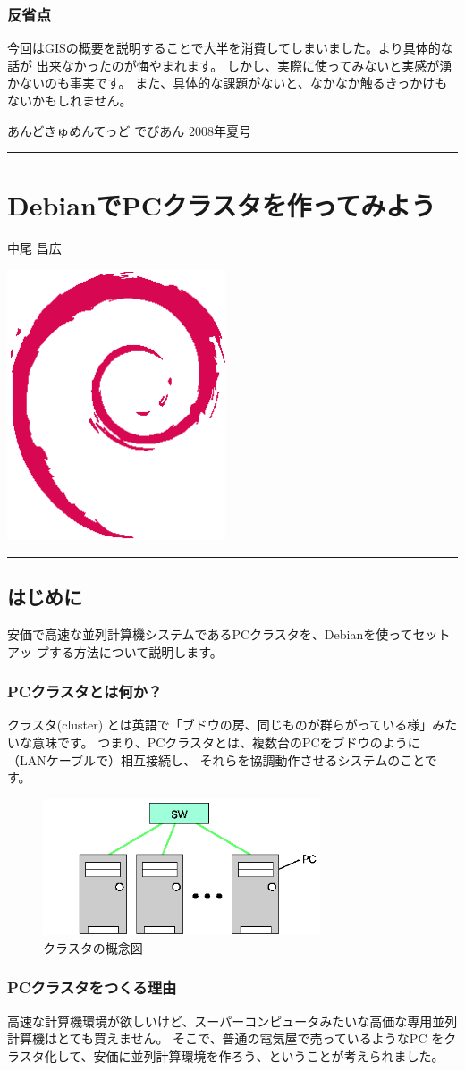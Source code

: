 \documentclass[mingoth,a4paper]{jsarticle}
\renewcommand{\dancersection}[2]{%
\newpage
あんどきゅめんてっど でびあん 2008年夏号
%
\vspace{0.1mm}\\
{\color{dancerlightblue}\rule{\hsize}{2mm}}

%
%
\begin{minipage}[t]{0.6\hsize}
\color{dancerdarkblue}
\vspace{1cm}
\section{#1}
\hfill{}#2\\
\end{minipage}
\begin{minipage}[t]{0.4\hsize}
\vspace{-2cm}
\hfill{}\includegraphics[height=8cm]{image200502/openlogo-nd.eps}\\
\vspace{-5cm}
\end{minipage}
%
%
{\color{dancerdarkblue}\rule{0.74\hsize}{2mm}}
%
\vspace{2cm}
}
\begin{document}
\subsubsection{反省点}
今回はGISの概要を説明することで大半を消費してしまいました。より具体的な話が
出来なかったのが悔やまれます。
しかし、実際に使ってみないと実感が湧かないのも事実です。
また、具体的な課題がないと、なかなか触るきっかけもないかもしれません。

\dancersection{DebianでPCクラスタを作ってみよう}{中尾 昌広}

\subsection{はじめに}
安価で高速な並列計算機システムであるPCクラスタを、Debianを使ってセットアッ
プする方法について説明します。

\subsubsection{PCクラスタとは何か？}
クラスタ(cluster) とは英語で「ブドウの房、同じものが群らがっている様」みたいな意味です。
つまり、PCクラスタとは、複数台のPCをブドウのように（LANケーブルで）相互接続し、
それらを協調動作させるシステムのことです。

\begin{figure}[!htbp]
 \begin{center}
 \includegraphics[width=82mm]{image200802/cluster.png}
  \caption{クラスタの概念図}
  \label{fig:cluster}
 \end{center}
\end{figure}
\vspace{-3mm}

\subsubsection{PCクラスタをつくる理由}
高速な計算機環境が欲しいけど、スーパーコンピュータみたいな高価な専用並列計算機はとても買えません。
そこで、普通の電気屋で売っているようなPC をクラスタ化して、安価に並列計算環境を作ろう、ということが考えられました。
\end{document}
